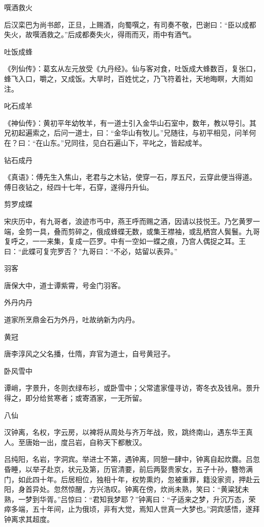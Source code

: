 \documentclass[a4paper,12pt,UTF8,twoside]{ctexbook}
\begin{document}
    噀酒救火
    
    后汉栾巴为尚书郎，正旦，上赐酒，向蜀噀之，有司奏不敬，巴谢曰：“臣以成都失火，故噀酒救之。”后成都奏失火，得雨而灭，雨中有酒气。
    
    吐饭成蜂
    
    《列仙传》：葛玄从左元放受《九丹经》。仙与客对食，吐饭成大蜂数百，复张口，蜂飞入口，嚼之，又成饭。大旱时，百姓忧之，乃飞符着社，天地晦瞑，大雨如注。
    
    叱石成羊
    
    《神仙传》：黄初平年幼牧羊，有一道士引入金华山石室中，数年，教以导引。其兄初起遍索之，后问一道士，曰：“金华山有牧儿。”兄随往，与初平相见，问羊何在？曰：“在山东。”兄同往，见白石遍山下，平叱之，皆起成羊。
    
    钻石成丹
    
    《真语》：傅先生入焦山，老君与之木钻，使穿一石，厚五尺，云穿此便当得道。傅日夜钻之，经四十七年，石穿，遂得丹升仙。
    
    剪罗成蝶
    
    宋庆历中，有九哥者，浪迹市丐中，燕王呼而赐之酒，因请以技悦王。乃乞黄罗一端，金剪一具，叠而剪碎之，俄成蜂蝶无数，或集王襟袖，或乱栖宫人鬓鬟。九哥复呼之，一一来集，复成一匹罗。中有一空如一蝶之痕，乃宫人偶捉之耳。王曰：“此蝶可复完罗否？”九哥曰：“不必，姑留以表异。”
    
    羽客
    
    唐保大中，道士谭紫霄，号金门羽客。
    
    外丹内丹
    
    道家所烹鼎金石为外丹，吐故纳新为内丹。
    
    黄冠
    
    唐李淳风之父名播，仕隋，弃官为道士，自号黄冠子。
    
    卧风雪中
    
    谭峭，字景升，冬则衣绿布衫，或卧雪中；父常遣家僮寻访，寄冬衣及钱帛。景升得之，即分给贫寒者；或寄酒家，一无所留。
    
    八仙
    
    汉钟离，名权，字云房，以裨将从周处与齐万年战，败，跳终南山，遇东华王真人。至唐始一出，度吕岩，自称天下都散汉。
    
    吕纯阳，名岩，字洞宾。举进士不第，遇钟离，同憩一肆中，钟离自起炊爨。吕忽昏睡，以举子赴京，状元及第，历官清要，前后两娶贵家女，五子十孙，簪笏满门，如此四十年。后居相位，独相十年，权势熏灼，忽被重罪，籍没家资，押赴云阳，身首异处。忽然惊醒，方兴浩叹。钟离在傍，炊尚未熟，笑曰：“黄粱犹未熟，一梦到华胥。”吕惊曰：“君知我梦耶？”钟离曰：“子适来之梦，升沉万态，荣瘁多端，五十年间，止为俄顷，非有大觉，焉知人世真一大梦也。”洞宾感悟，遂拜钟离求其超度。
    
\end{document}
